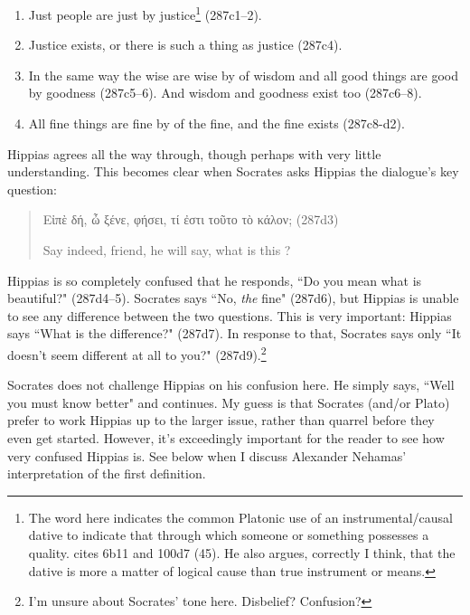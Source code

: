 \documentclass[11pt]{article}
\begin{document}
\begin{enumerate}

    \item Just people are just by justice\footnote{The word  here
        indicates the common Platonic use of an instrumental/causal
        dative to indicate that through which someone or something
        possesses a quality.  \citet{woodruff1982} cites
         6b11 and  100d7 (45).  He also
        argues, correctly I think, that the dative is more a matter of
    logical cause than true instrument or means.} (287c1--2).

    \item Justice exists, or there is such a thing as justice (287c4).

    \item In the same way the wise are wise by of wisdom and all good
        things are good by goodness (287c5--6).  And wisdom and goodness
        exist too (287c6--8).

    \item All fine things are fine by of the fine, and the fine exists
        (287c8-d2).

\end{enumerate}

Hippias agrees all the way through, though perhaps with very little
understanding.  This becomes clear when Socrates asks Hippias the
dialogue's key question:

\begin{quote}

    {\g
    Εἰπὲ δή, ὦ ξένε, φήσει, τί ἐστι τοῦτο τὸ κάλον;
    } (287d3)

    Say indeed, friend, he will say, what is this ?

\end{quote}

Hippias is so completely confused that he responds, ``Do you mean what is
beautiful?" (287d4--5).  Socrates says ``No, \emph{the} fine" (287d6), but
Hippias is unable to see any difference between the two questions.  This is
very important: Hippias says ``What is the difference?" (287d7).  In
response to that, Socrates says only ``It doesn't seem different at all to
you?" (287d9).\footnote{I'm unsure about Socrates' tone here.  Disbelief?
Confusion?}

Socrates does not challenge Hippias on his confusion here.  He simply says,
``Well you must know better" and continues.  My guess is that Socrates
(and/or Plato) prefer to work Hippias up to the larger issue, rather than
quarrel before they even get started.  However, it's exceedingly important
for the reader to see how very confused Hippias is.  See below when
I discuss Alexander Nehamas' interpretation of the first definition.
\end{document}
